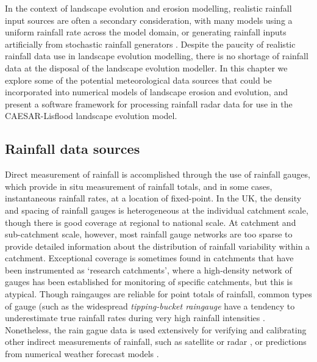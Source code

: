 In the context of landscape evolution and erosion modelling, realistic rainfall input sources are often a secondary consideration, with many models using a uniform rainfall rate across the model domain, or generating rainfall inputs artificially from stochastic rainfall generators \citep[Chapter \ref{chapter_RainfallInLEMs}][]{Tucker2000}. Despite the paucity of realistic rainfall data use in landscape evolution modelling, there is no shortage of rainfall data at the disposal of the landscape evolution modeller. In this chapter we explore some of the potential meteorological data sources that could be incorporated into numerical models of landscape erosion and evolution, and present a software framework for processing rainfall radar data for use in the CAESAR-Lisflood landscape evolution model.

\subsection{Rainfall data sources}
Direct measurement of rainfall is accomplished through the use of rainfall gauges, which provide in situ measurement of rainfall totals, and in some cases, instantaneous rainfall rates, at a location of fixed-point. In the UK, the density and spacing of rainfall gauges is heterogeneous at the individual catchment scale, though there is good coverage at regional to national scale. At catchment and sub-catchment scale, however, most rainfall gauge networks are too sparse to provide detailed information about the distribution of rainfall variability within a catchment. Exceptional coverage is sometimes found in catchments that have been instrumented as `research catchments', where a high-density network of gauges has been established for monitoring of specific catchments, \citep[e.g. Plynlimon][]{newson1979results} but this is atypical. Though raingauges are reliable for point totals of rainfall, common types of gauge (such as the widespread \textit{tipping-bucket raingauge} have a tendency to underestimate true rainfall rates during very high rainfall intensities \citep{habib2001sampling,ciach2003local}. Nonetheless, the rain gague data is used extensively for verifying and calibrating other indirect measurements of rainfall, such as satellite or radar \citep{harrison2000improving,ebert2007methods}, or predictions from numerical weather forecast models \citep{golding2000quantitative}.

